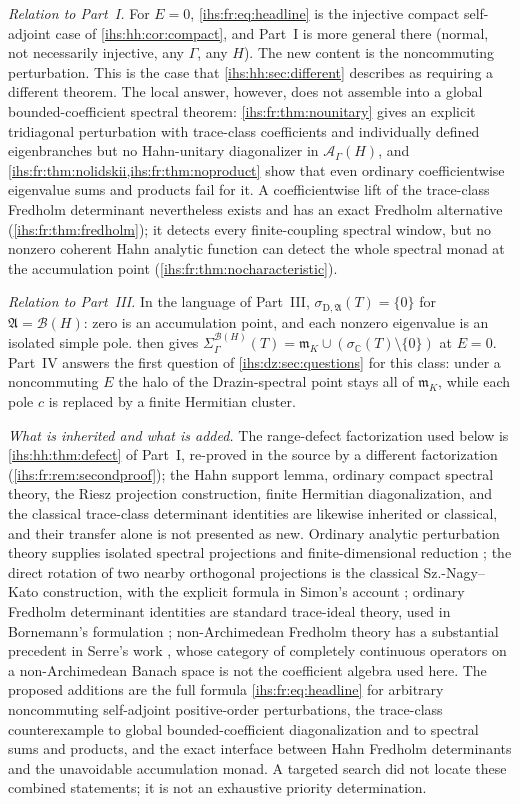 \documentclass[11pt,a4paper]{article}
\numberwithin{equation}{section}
\theoremstyle{definition}
\theoremstyle{remark}
\newcommand{\C}{\mathbb C}
\newcommand{\mK}{\mathfrak m_K}
\newcommand{\B}{\mathcal B(H)}
\newcommand{\Ahh}{\mathcal A_\Gamma(H)}
\newcommand{\Alg}{\mathfrak A}
\newcommand{\sigD}{\sigma_{\mathrm D,\Alg}}
\begin{document}
\emph{Relation to Part~I.} For $E=0$, \eqref{ihs:fr:eq:headline} is the
injective compact self-adjoint case of \cref{ihs:hh:cor:compact}, and
Part~I is more general there (normal, not necessarily injective, any
$\Gamma$, any $H$). The new content is the noncommuting perturbation. This is
the case that \cref{ihs:hh:sec:different} describes as requiring a different
theorem. The local answer, however, does not assemble into a global
bounded-coefficient spectral theorem: \cref{ihs:fr:thm:nounitary} gives an
explicit tridiagonal perturbation with trace-class coefficients and
individually defined eigenbranches but no Hahn-unitary diagonalizer in
$\Ahh$, and \cref{ihs:fr:thm:nolidskii,ihs:fr:thm:noproduct} show that even
ordinary coefficientwise eigenvalue sums and products fail for it. A
coefficientwise lift of the trace-class Fredholm determinant nevertheless
exists and has an exact Fredholm alternative
(\cref{ihs:fr:thm:fredholm}); it detects every finite-coupling spectral
window, but no nonzero coherent Hahn analytic function can detect the whole
spectral monad at the accumulation point
(\cref{ihs:fr:thm:nocharacteristic}).

\emph{Relation to Part~III.} In the language of Part~III,
$\sigD(T)=\{0\}$ for $\Alg=\B$: zero is an accumulation point, and each
nonzero eigenvalue is an isolated simple pole.  then
gives $\Sigma^{\B}_\Gamma(T)=\mK\cup(\sigma_\C(T)\setminus\{0\})$ at $E=0$.
Part~IV answers the first question of \cref{ihs:dz:sec:questions} for this
class: under a noncommuting $E$ the halo of the Drazin-spectral point stays
all of $\mK$, while each pole $c$ is replaced by a finite Hermitian cluster.

\emph{What is inherited and what is added.} The range-defect factorization
used below is \cref{ihs:hh:thm:defect} of Part~I, re-proved in the source by
a different factorization (\cref{ihs:fr:rem:secondproof}); the Hahn support
lemma, ordinary compact spectral theory, the Riesz projection construction,
finite Hermitian diagonalization, and the classical trace-class determinant
identities are likewise inherited or classical, and their transfer alone is
not presented as new. Ordinary analytic perturbation theory supplies isolated
spectral projections and finite-dimensional reduction \cite{Kato}; the
direct rotation of two nearby orthogonal projections is the classical
Sz.-Nagy--Kato construction, with the explicit formula in Simon's account
\cite{SimonProjections}; ordinary Fredholm determinant identities are
standard trace-ideal theory, used in Bornemann's formulation
\cite{Bornemann}; non-Archimedean Fredholm theory has a substantial
precedent in Serre's work \cite{Serre}, whose category of completely
continuous operators on a non-Archimedean Banach space is not the
coefficient algebra used here. The proposed additions are the full formula
\eqref{ihs:fr:eq:headline} for arbitrary noncommuting self-adjoint
positive-order perturbations, the trace-class counterexample to global
bounded-coefficient diagonalization and to spectral sums and products, and
the exact interface between Hahn Fredholm determinants and the unavoidable
accumulation monad. A targeted search did not locate these combined
statements; it is not an exhaustive priority determination.
\end{document}
